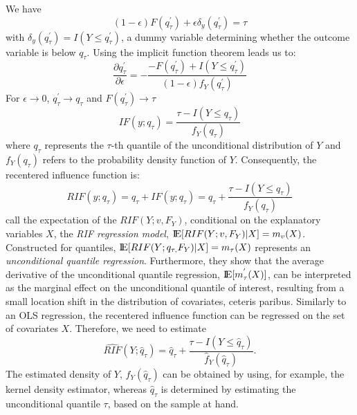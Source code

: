 We have
\begin{equation*}
  (1-\epsilon)F(q_{\tau}^{'})+\epsilon \delta_{y}(q_{\tau}^{'})=\tau
\end{equation*}
with $\delta_{y}(q_{\tau}^{'})=I(Y\leq q_{\tau}^{'})$, a dummy variable determining whether the outcome variable is below $q_{\tau}$. Using the implicit function theorem leads us to:
\begin{equation*}\label{13}
  \frac{\partial q_{\tau}^{'}}{\partial \epsilon}=-\frac{-F(q_{\tau}^{'})+I(Y \leq q_{\tau}^{'})}{(1-\epsilon)f_{Y}(q_{\tau}^{'})}
\end{equation*}
For $\epsilon \rightarrow 0$, $q_{\tau}^{'} \rightarrow q_{\tau}$ and $F(q_{\tau}^{'}) \rightarrow \tau$
\begin{equation}\label{14}
  IF(y;q_{\tau})=\frac{\tau - I(Y \leq q_{\tau})}{f_{Y}(q_{\tau})}
\end{equation}
where $q_{\tau}$ represents the $\tau$-th quantile of the unconditional distribution of $Y$ and $f_{Y}(q_{\tau})$ refers to the probability density function of $Y$. Consequently, the recentered influence function is:
\begin{equation}\label{15}
  RIF(y;q_{\tau})=q_{\tau}+IF(y;q_{\tau})=q_{\tau} + \frac{\tau - I(Y \leq q_{\tau})}{f_{Y}(q_{\tau})}
\end{equation}
\cite{Firpo&Fortin&Lemieux:09} call the expectation of the $RIF(Y; v,F_{Y})$, conditional on the explanatory variables $X$, the \emph{RIF regression model}, $\mbox{I\negthinspace E}[RIF(Y; v, F_{Y})|X]=m_{v}(X)$. Constructed for quantiles, $\mbox{I\negthinspace E}[RIF(Y; q_{\tau,} F_{Y})|X]=m_{\tau}(X)$ represents an \emph{unconditional quantile regression}. Furthermore, they show that the average derivative of the unconditional quantile regression, $\mbox{I\negthinspace E}[m_{\tau}^{'}(X)]$, can be interpreted as the marginal effect on the unconditional quantile of interest, resulting from a small location shift in the distribution of covariates, ceteris paribus. Similarly to an OLS regression, the recentered influence function can be regressed on the set of covariates $X$. Therefore, we need to estimate
\begin{equation*}
  \widehat{RIF}(Y; \hat{q}_{\tau})=\hat{q}_{\tau}+ \frac{\tau - I(Y \leq \hat{q}_{\tau})}{\hat{f}_{Y}(\hat{q}_{\tau})}.
\end{equation*}
The estimated density of $Y$, $\hat{f}_{Y}(\hat{q}_{\tau})$ can be obtained by using, for example, the kernel density estimator, whereas $\hat{q}_{\tau}$ is determined by estimating the unconditional quantile $\tau$, based on the sample at hand.
